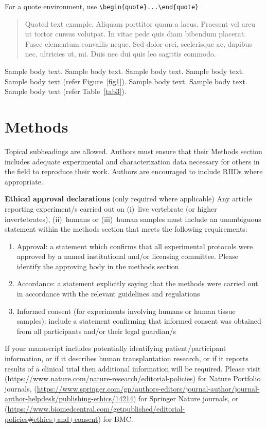 \documentclass[default,pdflatex,iicol]{sn-jnl}%
\begin{document}
\noindent
For a quote environment, use \verb+\begin{quote}...\end{quote}+
\begin{quote}
Quoted text example. Aliquam porttitor quam a lacus. Praesent vel arcu ut tortor cursus volutpat. In vitae pede quis diam bibendum placerat. Fusce elementum
convallis neque. Sed dolor orci, scelerisque ac, dapibus nec, ultricies ut, mi. Duis nec dui quis leo sagittis commodo.
\end{quote}

Sample body text. Sample body text. Sample body text. Sample body text. Sample body text (refer Figure~\ref{fig1}). Sample body text. Sample body text. Sample body text (refer Table~\ref{tab3}). 

\section{Methods}\label{sec11}

Topical subheadings are allowed. Authors must ensure that their Methods section includes adequate experimental and characterization data necessary for others in the field to reproduce their work. Authors are encouraged to include RIIDs where appropriate. 

\textbf{Ethical approval declarations} (only required where applicable) Any article reporting experiment/s carried out on (i)~live vertebrate (or higher invertebrates), (ii)~humans or (iii)~human samples must include an unambiguous statement within the methods section that meets the following requirements: 

\begin{enumerate}[1.]
\item Approval: a statement which confirms that all experimental protocols were approved by a named institutional and/or licensing committee. Please identify the approving body in the methods section

\item Accordance: a statement explicitly saying that the methods were carried out in accordance with the relevant guidelines and regulations

\item Informed consent (for experiments involving humans or human tissue samples): include a statement confirming that informed consent was obtained from all participants and/or their legal guardian/s
\end{enumerate}

If your manuscript includes potentially identifying patient/participant information, or if it describes human transplantation research, or if it reports results of a clinical trial then  additional information will be required. Please visit (\url{https://www.nature.com/nature-research/editorial-policies}) for Nature Portfolio journals, (\url{https://www.springer.com/gp/authors-editors/journal-author/journal-author-helpdesk/publishing-ethics/14214}) for Springer Nature journals, or (\url{https://www.biomedcentral.com/getpublished/editorial-policies\#ethics+and+consent}) for BMC.
\end{document}
